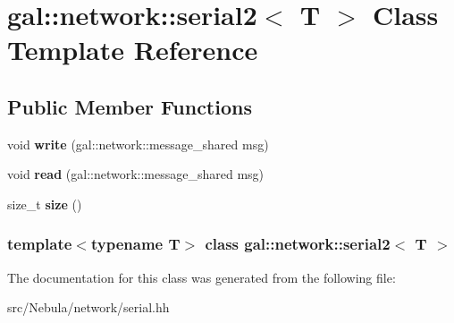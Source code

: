 \hypertarget{classgal_1_1network_1_1serial2}{\section{gal\-:\-:network\-:\-:serial2$<$ \-T $>$ \-Class \-Template \-Reference}
\label{classgal_1_1network_1_1serial2}
}
\subsection*{\-Public \-Member \-Functions}
\begin{DoxyCompactItemize}
\item 
\hypertarget{classgal_1_1network_1_1serial2_afb7c93f57726c3dd3ec0332134bcd9b2}{void {\bfseries write} (gal\-::network\-::message\-\_\-shared msg)}\label{classgal_1_1network_1_1serial2_afb7c93f57726c3dd3ec0332134bcd9b2}

\item 
\hypertarget{classgal_1_1network_1_1serial2_ad1dd2750aa53ca2294b34a7f04a5cef7}{void {\bfseries read} (gal\-::network\-::message\-\_\-shared msg)}\label{classgal_1_1network_1_1serial2_ad1dd2750aa53ca2294b34a7f04a5cef7}

\item 
\hypertarget{classgal_1_1network_1_1serial2_adb6e73cdcbc1f67f71eaed2bdbeab6bb}{size\-\_\-t {\bfseries size} ()}\label{classgal_1_1network_1_1serial2_adb6e73cdcbc1f67f71eaed2bdbeab6bb}

\end{DoxyCompactItemize}
\subsubsection*{template$<$typename T$>$ class gal\-::network\-::serial2$<$ T $>$}



\-The documentation for this class was generated from the following file\-:\begin{DoxyCompactItemize}
\item 
src/\-Nebula/network/serial.\-hh\end{DoxyCompactItemize}
